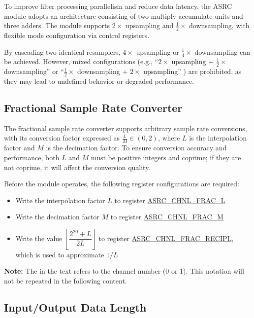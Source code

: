 \documentclass[main\_\_EN.tex]{subfiles}
\begin{document}
To improve filter processing parallelism and reduce data latency, the ASRC module adopts an architecture consisting of two multiply-accumulate units and three adders. The module supports $2\times$ upsampling and $\frac{1}{2}\times$ downsampling, with flexible mode configuration via control registers.

By cascading two identical resamplers, $4\times$ upsampling or $\frac{1}{4}\times$ downsampling can be achieved. However, mixed configurations (e.g., “$2\times$ upsampling + $\frac{1}{2}\times$ downsampling” or “$\frac{1}{2}\times$ downsampling + $2\times$ upsampling” ) are prohibited, as they may lead to undefined behavior or degraded performance.



\subsection{Fractional Sample Rate Converter}

The fractional sample rate converter supports arbitrary sample rate conversions, with its conversion factor expressed as $\frac{L}{M} \in (0, 2)$, where $L$ is the interpolation factor and $M$ is the decimation factor. To ensure conversion accuracy and performance, both $L$ and $M$ must be positive integers and coprime; if they are not coprime, it will affect the conversion quality.

Before the module operates, the following register configurations are required:

\begin{itemize}
  \item Write the interpolation factor $L$ to register \hyperref[fielddesc:ASRCCHNL0FRACL]{ASRC\_CHNL\_FRAC\_L}
  \item Write the decimation factor $M$ to register \hyperref[fielddesc:ASRCCHNL0FRACM]{ASRC\_CHNL\_FRAC\_M}
  \item Write the value $\left\lfloor \dfrac{2^{20} + L}{2L} \right\rfloor$ to register \hyperref[fielddesc:ASRCCHNL0FRACRECIPL]{ASRC\_CHNL\_FRAC\_RECIPL}, which is used to approximate $1/L$
\end{itemize}

\textbf{Note:} The  in the text refers to the channel number (0 or 1). This notation will not be repeated in the following content.


\subsection{Input/Output Data Length}
\label{subsec:input-output-len}
\end{document}
